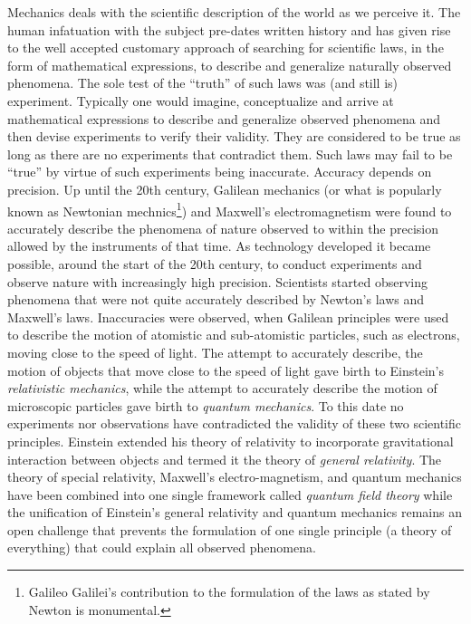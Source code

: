 \documentclass[graybox,envcountchap,sectrefs]{svmonoMuga}
\begin{document}
Mechanics deals with the scientific description of the world as we perceive it. The human infatuation with the subject pre-dates written history and has given rise to the well accepted customary approach of searching for  scientific laws, in the form of mathematical expressions, to describe and generalize naturally observed phenomena. The sole test of the ``truth'' of such laws was (and 
still is) experiment. Typically one would imagine, conceptualize and arrive at mathematical expressions to describe and generalize observed phenomena and then devise 
experiments to verify their validity. They are considered to be true as long as there are no experiments that contradict them.
Such laws may fail to be ``true'' by virtue of such experiments being inaccurate. Accuracy depends on precision. Up until the 20th century, Galilean mechanics (or what is popularly 
known as Newtonian mechnics\footnote{Galileo Galilei's contribution to the formulation of the laws as stated by Newton is monumental.}) and Maxwell's electromagnetism were 
found to accurately describe the phenomena of nature observed to within the precision allowed by the instruments of that time. As technology developed it became possible, around 
the start of the 20th century, to conduct experiments and observe nature with increasingly high precision. Scientists started observing phenomena that were not quite accurately 
described by Newton's laws and Maxwell's laws. Inaccuracies were observed, when Galilean principles were used to describe the motion of atomistic and sub-atomistic particles,  such as electrons, moving close to the speed of light. The attempt to accurately describe, the motion of objects that move close to the speed of light gave birth to 
Einstein's \emph{relativistic mechanics}, while the attempt to accurately describe the motion of microscopic particles gave birth to \emph{quantum mechanics}. To this date no experiments nor 
observations have contradicted the validity of these two scientific principles. Einstein extended his theory of relativity to incorporate gravitational interaction between objects and termed it the theory of \emph{general relativity}. The theory of special relativity, Maxwell's electro-magnetism, and quantum mechanics have been 
combined into one single framework called \emph{quantum field theory} while the unification of Einstein's general relativity and quantum mechanics remains an open challenge that 
prevents the formulation of one single principle (a theory of everything) that could explain all observed phenomena.
\end{document}
